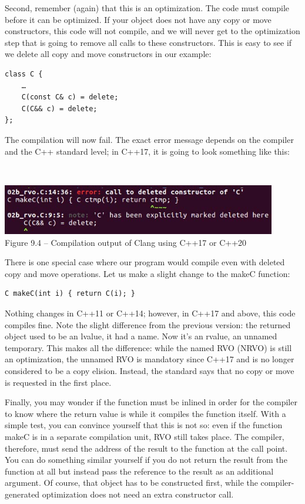 Second, remember (again) that this is an optimization. The code must compile before it can be optimized. If your object does not have any copy or move constructors, this code will not compile, and we will never get to the optimization step that is going to remove all calls to these constructors. This is easy to see if we delete all copy and move constructors in our example:

\begin{lstlisting}[style=styleCXX]
class C {
	…
	C(const C& c) = delete;
	C(C&& c) = delete;
}; 
\end{lstlisting}

The compilation will now fail. The exact error message depends on the compiler and the C++ standard level; in C++17, it is going to look something like this:

\hspace*{\fill} \\ %
\begin{center}
\includegraphics[width=0.9\textwidth]{content/3/chapter9/images/4.jpg}\\
Figure 9.4 – Compilation output of Clang using C++17 or C++20
\end{center}

There is one special case where our program would compile even with deleted copy and move operations. Let us make a slight change to the makeC function:

\begin{lstlisting}[style=styleCXX]
C makeC(int i) { return C(i); }
\end{lstlisting}

Nothing changes in C++11 or C++14; however, in C++17 and above, this code compiles fine. Note the slight difference from the previous version: the returned object used to be an lvalue, it had a name. Now it’s an rvalue, an unnamed temporary. This makes all the difference: while the named RVO (NRVO) is still an optimization, the unnamed RVO is mandatory since C++17 and is no longer considered to be a copy elision. Instead, the standard says that no copy or move is requested in the first place. 

Finally, you may wonder if the function must be inlined in order for the compiler to know where the return value is while it compiles the function itself. With a simple test, you can convince yourself that this is not so: even if the function makeC is in a separate compilation unit, RVO still takes place. The compiler, therefore, must send the address of the result to the function at the call point. You can do something similar yourself if you do not return the result from the function at all but instead pass the reference to the result as an additional argument. Of course, that object has to be constructed first, while the compiler-generated optimization does not need an extra constructor call. 

